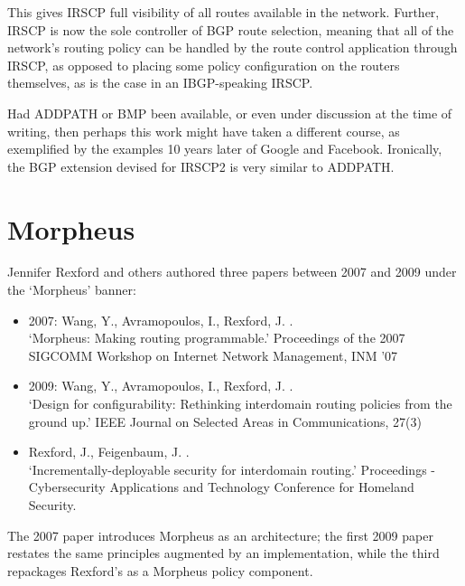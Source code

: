 This gives IRSCP full visibility of all routes available in the network. Further, IRSCP is now the sole controller of BGP route selection, meaning that all of the network's routing policy can be handled by the route control application through IRSCP, as opposed to placing some policy configuration on the routers themselves, as is the case in an IBGP-speaking IRSCP.

Had ADDPATH or BMP been available, or even under discussion at the time of writing, then perhaps this work might have taken a different course, as exemplified by the examples 10 years later of Google and Facebook.
Ironically, the BGP extension devised for IRSCP2 is very similar to ADDPATH.

\section{Morpheus}
Jennifer Rexford and others authored three papers between 2007 and 2009 under the `Morpheus' banner:
\begin{itemize}[noitemsep,nolistsep]

	\item{2007: Wang, Y., Avramopoulos, I.,  Rexford, J. \cite{Wang2007}.\\`Morpheus: Making routing programmable.' Proceedings of the 2007 SIGCOMM Workshop on Internet Network Management, INM ’07}
	\item{2009: Wang, Y., Avramopoulos, I.,  Rexford, J. \cite{Wang2009}.
	            \\`Design for configurability: Rethinking interdomain routing policies from the ground up.' IEEE Journal on Selected Areas in Communications, 27(3)}
	\item{Rexford, J.,  Feigenbaum, J. \cite{Rexford2009}.
	            \\`Incrementally-deployable security for interdomain routing.' Proceedings - Cybersecurity Applications and Technology Conference for Homeland Security.}
\end{itemize}

\smallskip
The 2007 paper introduces Morpheus as an architecture; the first 2009 paper restates the same principles augmented by an implementation, while the third repackages Rexford's \cite{Karlin2006} as a Morpheus policy component.


